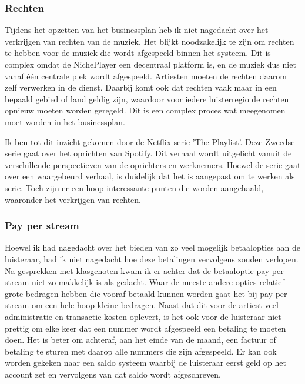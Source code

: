 \subsubsection*{Rechten}
Tijdens het opzetten van het businessplan heb ik niet nagedacht over het verkrijgen van rechten van de muziek. Het blijkt noodzakelijk te zijn om rechten te hebben voor de muziek die wordt afgespeeld binnen het systeem. Dit is complex omdat de NichePlayer een decentraal platform is, en de muziek dus niet vanaf één centrale plek wordt afgespeeld. Artiesten moeten de rechten daarom zelf verwerken in de dienst. Daarbij komt ook dat rechten vaak maar in een bepaald gebied of land geldig zijn, waardoor voor iedere luisterregio de rechten opnieuw moeten worden geregeld. Dit is een complex proces wat meegenomen moet worden in het businessplan.

Ik ben tot dit inzicht gekomen door de Netflix serie 'The Playlist'. Deze Zweedse serie gaat over het oprichten van Spotify. Dit verhaal wordt uitgelicht vanuit de verschillende perspectieven van de oprichters en werknemers. Hoewel de serie gaat over een waargebeurd verhaal, is duidelijk dat het is aangepast om te werken als serie. Toch zijn er een hoop interessante punten die worden aangehaald, waaronder het verkrijgen van rechten.


\subsubsection*{Pay per stream}
Hoewel ik had nagedacht over het bieden van zo veel mogelijk betaalopties aan de luisteraar, had ik niet nagedacht hoe deze betalingen vervolgens zouden verlopen. Na gesprekken met klasgenoten kwam ik er achter dat de betaaloptie pay-per-stream niet zo makkelijk is als gedacht. Waar de meeste andere opties relatief grote bedragen hebben die vooraf betaald kunnen worden gaat het bij pay-per-stream om een hele hoop kleine bedragen. Naast dat dit voor de artiest veel administratie en transactie kosten oplevert, is het ook voor de luisteraar niet prettig om elke keer dat een nummer wordt afgespeeld een betaling te moeten doen. Het is beter om achteraf, aan het einde van de maand, een factuur of betaling te sturen met daarop alle nummers die zijn afgespeeld. Er kan ook worden gekeken naar een saldo systeem waarbij de luisteraar eerst geld op het account zet en vervolgens van dat saldo wordt afgeschreven.


